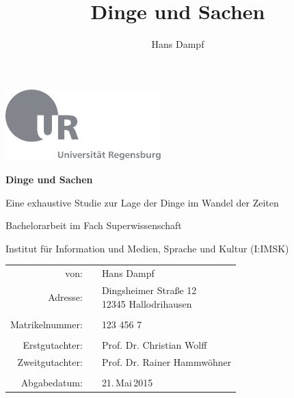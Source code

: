 \documentclass[12pt,ngerman,a4paper,DIV=11]{scrartcl}
\title{Dinge und Sachen\\\vspace{0.5em}{\large Eine exhaustive Studie zur Lage der Dinge im Wandel der Zeiten}}
\author{Hans Dampf}
\makeatletter
\newif \if@mainmatter \@mainmattertrue
\newcommand*\frontmatter{\clearpage\thispagestyle{plain}\@mainmatterfalse\pagenumbering{roman}}
\makeatother
\begin{document}
\frontmatter
\begin{titlepage}
  \begin{center}

  \hbox{\hspace{2.74cm}\includegraphics[width=0.45\textwidth]{Template/UR-Logo/ur-logo-mit-text.pdf}}

  \vspace{1.8cm}

  {\huge\textbf{Dinge und Sachen}}

    \vspace{0.8cm}
  {\large{Eine exhaustive Studie zur Lage der Dinge im Wandel der Zeiten}}
  
  \vspace{1.5cm}

    Bachelorarbeit im Fach Superwissenschaft
  
    Institut für Information und Medien, Sprache und Kultur (I:IMSK)
  
  \vspace{0.8cm}
  \begin{center}
  \begin{tabular}{ r c l }
  von:             &  & Hans Dampf                                     \\
  Adresse:         &  & \parbox[t]{4cm}{ Dingsheimer Straße 12 \\ 12345 Hallodrihausen }  \\
                   &  &                                              \\
  Matrikelnummer:  &  & 123 456 7                                \\
                   &  &                                              \\
  Erstgutachter:   &  & Prof. Dr. Christian Wolff                                 \\
  Zweitgutachter:  &  & Prof. Dr. Rainer Hammwöhner                                \\
                   &  &                                              \\
  Abgabedatum:     &  & 21.\,Mai\,2015
  \end{tabular}
  \end{center}
  \end{center}
\end{titlepage}
\end{document}
